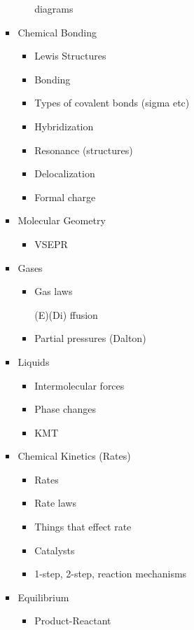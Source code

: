 \documentclass{article}
\begin{document}
\begin{itemize}
\begin{itemize}
\begin{itemize}
\begin{itemize}
								diagrams
							\end{itemize}
						\item Chemical Bonding
							\begin{itemize}
								\item Lewis Structures
								\item Bonding
								\item Types of covalent
								bonds (sigma etc)
								\item Hybridization
								\item Resonance
								(structures)
								\item Delocalization
								\item Formal charge
							\end{itemize}
						\item Molecular Geometry
							\begin{itemize}
								\item VSEPR
							\end{itemize}
						\item Gases
							\begin{itemize}
								\item Gas laws
								\item [(E)(Di)]ffusion
								\item Partial pressures
								(Dalton)
							\end{itemize}
						\item Liquids
							\begin{itemize}
								\item Intermolecular
								forces
								\item Phase changes
								\item KMT
							\end{itemize}
						\item Chemical Kinetics (Rates)
							\begin{itemize}
								\item Rates
								\item Rate laws
								\item Things
								that effect rate
								\item Catalysts
								\item 1-step,
								2-step,
								reaction
								mechanisms
							\end{itemize}
						\item Equilibrium
							\begin{itemize}
								\item Product-Reactant

\end{itemize}
\end{itemize}
\end{itemize}
\end{itemize}
\end{document}
